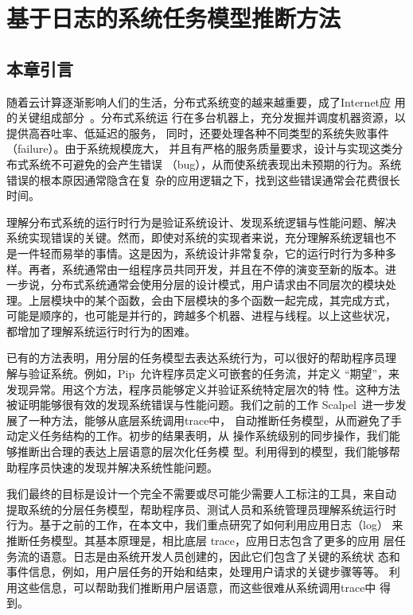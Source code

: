 \chapter{基于日志的系统任务模型推断方法}
\label{chap:logmining}

\section{本章引言}

随着云计算逐渐影响人们的生活，分布式系统变的越来越重要，成了Internet应
用的关键组成部分~\cite{gfs, mapreduce, bigtable, dynamo}。分布式系统运
行在多台机器上，充分发掘并调度机器资源，以提供高吞吐率、低延迟的服务，
同时，还要处理各种不同类型的系统失败事件（failure）。由于系统规模庞大，
并且有严格的服务质量要求，设计与实现这类分布式系统不可避免的会产生错误
（bug），从而使系统表现出未预期的行为。系统错误的根本原因通常隐含在复
杂的应用逻辑之下，找到这些错误通常会花费很长时间。

理解分布式系统的运行时行为是验证系统设计、发现系统逻辑与性能问题、解决
系统实现错误的关键。然而，即使对系统的实现者来说，充分理解系统逻辑也不
是一件轻而易举的事情。这是因为，系统设计非常复杂，它的运行时行为多种多
样。再者，系统通常由一组程序员共同开发，并且在不停的演变至新的版本。进
一步说，分布式系统通常会使用分层的设计模式，用户请求由不同层次的模块处
理。上层模块中的某个函数，会由下层模块的多个函数一起完成，其完成方式，
可能是顺序的，也可能是并行的，跨越多个机器、进程与线程。以上这些状况，
都增加了理解系统运行时行为的困难。

已有的方法表明，用分层的任务模型去表达系统行为，可以很好的帮助程序员理
解与验证系统。例如，Pip~\cite{pip}允许程序员定义可嵌套的任务流，并定义
“期望”，来发现异常。用这个方法，程序员能够定义并验证系统特定层次的特
性。这种方法被证明能够很有效的发现系统错误与性能问题。我们之前的工作
Scalpel~\cite{scalpel}进一步发展了一种方法，能够从底层系统调用trace中，
自动推断任务模型，从而避免了手动定义任务结构的工作。初步的结果表明，从
操作系统级别的同步操作，我们能够推断出合理的表达上层语意的层次化任务模
型。利用得到的模型，我们能够帮助程序员快速的发现并解决系统性能问题。

我们最终的目标是设计一个完全不需要或尽可能少需要人工标注的工具，来自动
提取系统的分层任务模型，帮助程序员、测试人员和系统管理员理解系统运行时
行为。基于之前的工作，在本文中，我们重点研究了如何利用应用日志（log）
来推断任务模型。其基本原理是，相比底层 trace，应用日志包含了更多的应用
层任务流的语意。日志是由系统开发人员创建的，因此它们包含了关键的系统状
态和事件信息，例如，用户层任务的开始和结束，处理用户请求的关键步骤等等。
利用这些信息，可以帮助我们推断用户层语意，而这些很难从系统调用trace中
得到。

